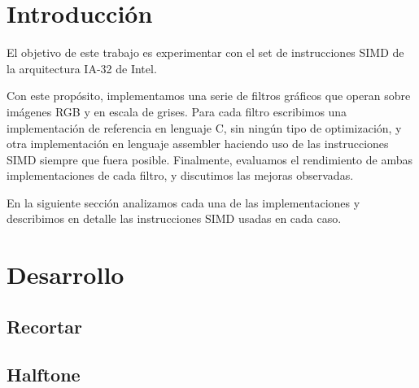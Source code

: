 \documentclass[a4paper,10pt,twoside]{article}
\begin{document}
\newpage




\tableofcontents

\newpage




\section{Introducción}

El objetivo de este trabajo es experimentar con el set de instrucciones SIMD de la arquitectura IA-32 de Intel. 

Con este propósito, implementamos una serie de filtros gráficos que operan sobre imágenes RGB y en escala de grises. Para cada filtro escribimos una implementación de referencia en lenguaje C, sin ningún tipo de optimización, y otra implementación en lenguaje assembler haciendo uso de las instrucciones SIMD siempre que fuera posible. Finalmente, evaluamos el rendimiento de ambas implementaciones de cada filtro, y discutimos las mejoras observadas.

En la siguiente sección analizamos cada una de las implementaciones y describimos en detalle las instrucciones SIMD usadas en cada caso.




\section{Desarrollo}

\subsection{Recortar}



\subsection{Halftone}
\end{document}
